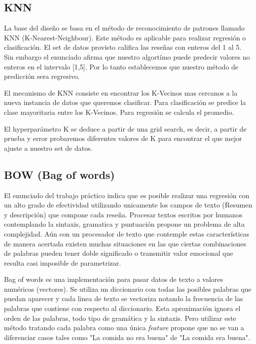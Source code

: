 \documentclass[a4paper,10pt]{article}
\begin{document}
	\subsection{KNN}
	La base del dise\~{n}o se basa en el m\'{e}todo de reconocimiento de patrones llamado KNN (K-Nearest-Neighbour). Este m\'{e}todo es aplicable para realizar regresi\'{o}n o clasificaci\'{o}n. El set de datos provisto califica las rese\~{n}as con enteros del 1 al 5. Sin embargo el enunciado afirma que nuestro algort\'{i}mo puede predecir valores no enteros en el intervalo [1,5]. Por lo tanto establecemos que nuestro m\'{e}todo de predicci\'{o}n sera regresivo.
	
	El mecanismo de KNN consiste en encontrar los K-Vecinos mas cercanos a la nueva instancia de datos que queremos clasificar. Para clasificaci\'{o}n se predice la clase mayoritaria entre los K-Vecinos. Para regresi\'{o}n se calcula el promedio.
	
	El hyperpar\'{a}metro K se deduce a partir de una grid search, es decir, a partir de prueba y error probaremos diferentes valores de K para encontrar el que mejor ajuste a nuestro set de datos.

		\subsection{BOW (Bag of words)}
	El enunciado del trabajo pr\'{a}ctico indica que es posible realizar una regresi\'{o}n con un alto grado de efectividad utilizando unicamente los campos de texto (Resumen y descripci\'{o}n) que compone cada rese\~{n}a. Procesar textos escritos por humanos contemplando la sintaxis, gramatica y puntuaci\'{o}n propone un problema de alta complejidad. A\'{u}n con un procesador de texto que contemple estas caracter\'{i}sticas de manera acertada existen muchas situaciones en las que ciertas combinaciones de palabras pueden tener doble significado o transmitir valor emocional que resulta casi imposible de parametrizar.
	
	Bag of words es una implementaci\'{o}n para pasar datos de texto a valores num\'{e}ricos (vectores). Se utiliza un diccionario con todas las posibles palabras que puedan aparecer y cada linea de texto se vectoriza notando la frecuencia de las palabras que contiene con respecto al diccionario. Esta aproximaci\'{o}n ignora el orden de las palabras, todo tipo de gram\'{a}tica y la sintaxis. Pero utilizar este m\'{e}todo tratando cada palabra como una \'{u}nica \textit{feature} propone que no se van a diferenciar casos tales como "La comida no era buena" de "La comida era buena".
	
\end{document}
